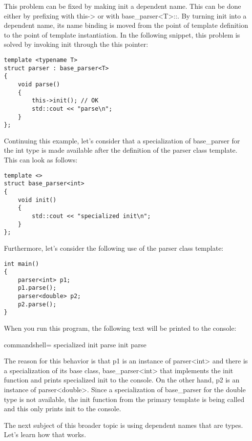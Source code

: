 This problem can be fixed by making init a dependent name. This can be done either by prefixing with this-> or with base\_parser<T>::. By turning init into a dependent name, its name binding is moved from the point of template definition to the point of template instantiation. In the following snippet, this problem is solved by invoking init through the this pointer:

\begin{lstlisting}[style=styleCXX]
template <typename T>
struct parser : base_parser<T>
{
	void parse()
	{
		this->init(); // OK
		std::cout << "parse\n";
	}
};
\end{lstlisting}

Continuing this example, let’s consider that a specialization of base\_parser for the int type is made available after the definition of the parser class template. This can look as follows:

\begin{lstlisting}[style=styleCXX]
template <>
struct base_parser<int>
{
	void init()
	{
		std::cout << "specialized init\n";
	}
};
\end{lstlisting}

Furthermore, let’s consider the following use of the parser class template:

\begin{lstlisting}[style=styleCXX]
int main()
{
	parser<int> p1;
	p1.parse();
	parser<double> p2;
	p2.parse();
}
\end{lstlisting}

When you run this program, the following text will be printed to the console:

\begin{tcblisting}{commandshell={}}
specialized init
parse
init
parse
\end{tcblisting}

The reason for this behavior is that p1 is an instance of parser<int> and there is a specialization of its base class, base\_parser<int> that implements the init function and prints specialized init to the console. On the other hand, p2 is an instance of parser<double>. Since a specialization of base\_parser for the double type is not available, the init function from the primary template is being called and this only prints init to the console.

The next subject of this broader topic is using dependent names that are types. Let’s learn how that works.


